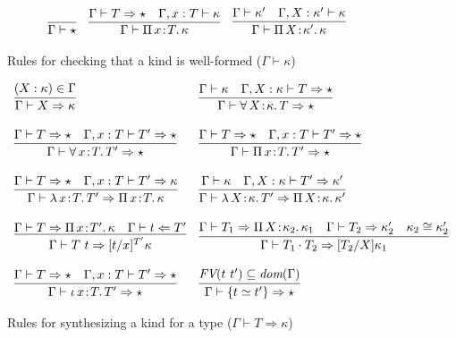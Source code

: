 \documentclass{article}
\newcommand{\abs}[4]{{#1}\, #2\! : \! #3.\, #4}
\newcommand{\tpcheck}[0]{\Leftarrow}
\newcommand{\tpsynth}[0]{\Rightarrow}
\begin{document}
\begin{figure}
  \[
  \begin{array}{llll}
    \infer{\Gamma \vdash \star}{\ } &
    \infer{\Gamma\vdash\abs{\Pi}{x}{T}{\kappa}}{\Gamma \vdash T \tpsynth \star & \Gamma,x:T\vdash\kappa} &
    \infer{\Gamma\vdash\abs{\Pi}{X}{\kappa'}{\kappa}}{\Gamma \vdash \kappa' & \Gamma,X:\kappa'\vdash\kappa}
  \end{array}
  \]
  \caption{Rules for checking that a kind is well-formed ($\Gamma \vdash \kappa$)}
  \label{fig:superknd}
\end{figure}

\begin{figure}
  \[
  \begin{array}{ll}
    \infer{\Gamma \vdash X \tpsynth \kappa}{(X : \kappa) \in \Gamma} &
    \infer{\Gamma\vdash \abs{\forall}{X}{\kappa}{T} \tpsynth \star}{\Gamma \vdash \kappa & \Gamma,X:\kappa\vdash T \tpsynth \star} \\ \\
    \infer{\Gamma\vdash\abs{\forall}{x}{T}{T'} \tpsynth \star}{\Gamma \vdash T \tpsynth \star & \Gamma,x:T\vdash T' \tpsynth \star} &
    \infer{\Gamma\vdash\abs{\Pi}{x}{T}{T'} \tpsynth \star}{\Gamma \vdash T \tpsynth \star & \Gamma,x:T\vdash T' \tpsynth \star} \\ \\
    \infer{\Gamma\vdash\abs{\lambda}{x}{T}{T'} \tpsynth \abs{\Pi}{x}{T}{\kappa}}{\Gamma \vdash T \tpsynth \star & \Gamma,x:T\vdash T'\tpsynth\kappa} &
    \infer{\Gamma\vdash\abs{\lambda}{X}{\kappa}{T'} \tpsynth \abs{\Pi}{X}{\kappa}{\kappa'}}{\Gamma \vdash \kappa & \Gamma,X:\kappa\vdash T'\tpsynth\kappa'} \\ \\
    \infer{\Gamma\vdash T\ t \tpsynth [t/x]^{T'}\kappa}{\Gamma\vdash T \tpsynth \abs{\Pi}{x}{T'}{\kappa} & \Gamma\vdash t \tpcheck T'} &
    \infer{\Gamma\vdash T_1 \cdot T_2 \tpsynth [T_2/X]\kappa_1}{\Gamma\vdash T_1 \tpsynth \abs{\Pi}{X}{\kappa_2}{\kappa_1} & \Gamma\vdash T_2 \tpsynth \kappa_2' & \kappa_2 \cong \kappa_2'} \\ \\
    \infer{\Gamma\vdash\abs{\iota}{x}{T}{T'} \tpsynth \star}{\Gamma \vdash T \tpsynth \star & \Gamma,x:T\vdash T' \tpsynth \star} &
    \infer{\Gamma\vdash \{ t \simeq t' \} \tpsynth \star}{\textit{FV}(t\ t')\subseteq\textit{dom}(\Gamma)}
  \end{array}
  \]
  \caption{Rules for synthesizing a kind for a type ($\Gamma \vdash T \tpsynth \kappa$)}
  \label{fig:knd}
\end{figure}
\end{document}
